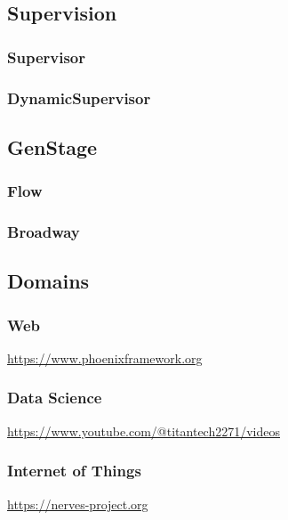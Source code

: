 \subsection{Supervision}
\subsubsection{Supervisor}
\subsubsection{DynamicSupervisor}

\subsection{GenStage}
\subsubsection{Flow}
\subsubsection{Broadway}

\subsection{Domains}

\subsubsection{Web}

\url{https://www.phoenixframework.org}



\subsubsection{Data Science}

\url{https://www.youtube.com/@titantech2271/videos}

\subsubsection{Internet of Things}

\url{https://nerves-project.org}

